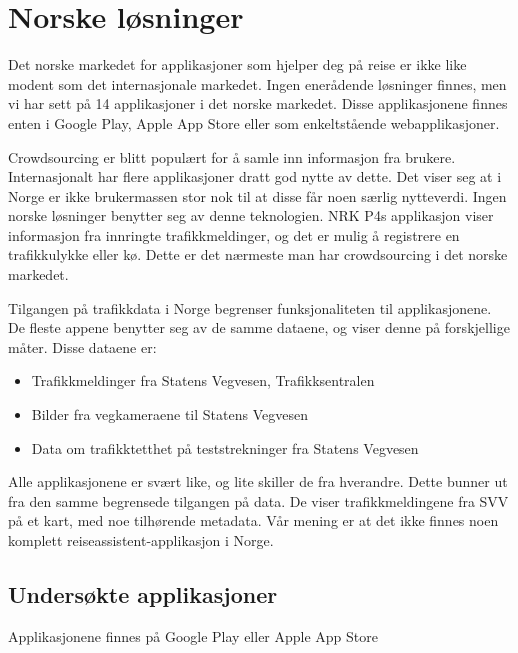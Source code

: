 \section{Norske løsninger}

Det norske markedet for applikasjoner som hjelper deg på reise er ikke like modent som det internasjonale markedet. Ingen enerådende løsninger finnes, men vi har sett på 14 applikasjoner i det norske markedet. Disse applikasjonene finnes enten i Google Play, Apple App Store eller som enkeltstående webapplikasjoner.

Crowdsourcing er blitt populært for å samle inn informasjon fra brukere. Internasjonalt har flere applikasjoner dratt god nytte av dette. Det viser seg at i Norge er ikke brukermassen stor nok til at disse får noen særlig nytteverdi. Ingen norske løsninger benytter seg av denne teknologien. NRK P4s applikasjon viser informasjon fra innringte trafikkmeldinger, og det er mulig å registrere en trafikkulykke eller kø. Dette er det nærmeste man har crowdsourcing i det norske markedet.

Tilgangen på trafikkdata i Norge begrenser funksjonaliteten til applikasjonene. De fleste appene benytter seg av de samme dataene, og viser denne på forskjellige måter. Disse dataene er:

\begin{itemize}
\item Trafikkmeldinger fra Statens Vegvesen, Trafikksentralen

\item Bilder fra vegkameraene til Statens Vegvesen

\item Data om trafikktetthet på teststrekninger fra Statens Vegvesen

\end{itemize}

Alle applikasjonene er svært like, og lite skiller de fra hverandre. Dette bunner ut fra den samme begrensede tilgangen på data. De viser trafikkmeldingene fra SVV på et kart, med noe tilhørende metadata. Vår mening er at det ikke finnes noen komplett reiseassistent-applikasjon i Norge.

\subsection{Undersøkte applikasjoner}

Applikasjonene finnes på Google Play eller Apple App Store

